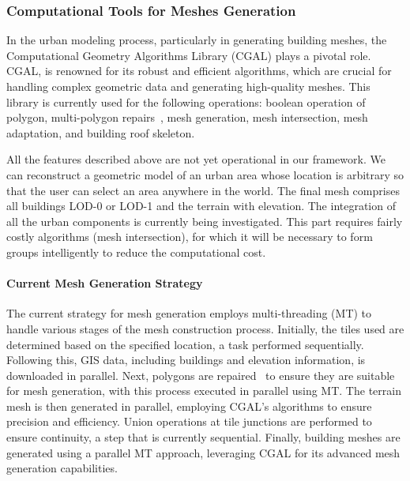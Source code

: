 \documentclass[runningheads]{llncs}
\begin{document}
\subsubsection{Computational Tools for Meshes Generation}

In the urban modeling process, particularly in generating building meshes, the Computational Geometry Algorithms Library (CGAL) plays a pivotal role. CGAL, \cite{the_cgal_project_cgal_2024} is renowned for its robust and efficient algorithms, which are crucial for handling complex geometric data and generating high-quality meshes. This library is currently used for the following operations: boolean operation of polygon, multi-polygon repairs~\cite{loriot_polygon_2024}, mesh generation, mesh intersection, mesh adaptation, and building roof skeleton.

All the features described above are not yet operational in our framework. We can reconstruct a geometric model of an urban area whose location is arbitrary so that the user can select an area anywhere in the world. The final mesh comprises all buildings LOD-0 or LOD-1 and the terrain with elevation. The integration of all the urban components is currently being investigated. This part requires fairly costly algorithms (mesh intersection), for which it will be necessary to form groups intelligently to reduce the computational cost.  

\paragraph{Current Mesh Generation Strategy}
The current strategy for mesh generation employs multi-threading (MT) to handle various stages of the mesh construction process. Initially, the tiles used are determined based on the specified location, a task performed sequentially. Following this, GIS data, including buildings and elevation information, is downloaded in parallel. Next, polygons are repaired~\cite{loriot_polygon_2024} to ensure they are suitable for mesh generation, with this process executed in parallel using MT. The terrain mesh is then generated in parallel, employing CGAL's algorithms to ensure precision and efficiency. Union operations at tile junctions are performed to ensure continuity, a step that is currently sequential. Finally, building meshes are generated using a parallel MT approach, leveraging CGAL for its advanced mesh generation capabilities.
\end{document}
